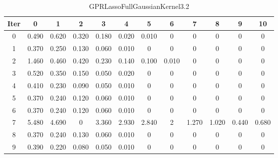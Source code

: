 \begin{table}
	\begin{center}
		\begin{tabular}{|c|c|c|c|c|c|c|c|c|c|c|c|}
			\hline
			Iter & 0 & 1 & 2 & 3 & 4 & 5 & 6 & 7 & 8 & 9 & 10 \\
			\hline
			0 & 0.490 & 0.620 & 0.320 & 0.180 & 0.020 & 0.010 & 0 & 0 & 0 & 0 & 0 \\
			\hline
			1 & 0.370 & 0.250 & 0.130 & 0.060 & 0.010 & 0 & 0 & 0 & 0 & 0 & 0 \\
			\hline
			2 & 1.460 & 0.460 & 0.420 & 0.230 & 0.140 & 0.100 & 0.010 & 0 & 0 & 0 & 0 \\
			\hline
			3 & 0.520 & 0.350 & 0.150 & 0.050 & 0.020 & 0 & 0 & 0 & 0 & 0 & 0 \\
			\hline
			4 & 0.410 & 0.230 & 0.090 & 0.050 & 0.010 & 0 & 0 & 0 & 0 & 0 & 0 \\
			\hline
			5 & 0.370 & 0.240 & 0.120 & 0.060 & 0.010 & 0 & 0 & 0 & 0 & 0 & 0 \\
			\hline
			6 & 0.370 & 0.240 & 0.120 & 0.060 & 0.010 & 0 & 0 & 0 & 0 & 0 & 0 \\
			\hline
			7 & 5.480 & 4.690 & 0 & 3.360 & 2.930 & 2.840 & 2 & 1.270 & 1.020 & 0.440 & 0.680 \\
			\hline
			8 & 0.370 & 0.240 & 0.130 & 0.060 & 0.010 & 0 & 0 & 0 & 0 & 0 & 0 \\
			\hline
			9 & 0.390 & 0.220 & 0.080 & 0.050 & 0.010 & 0 & 0 & 0 & 0 & 0 & 0 \\
			\hline
		\end{tabular}
	\end{center}
	\caption{GPRLassoFullGaussianKernel3.2}
\end{table}
